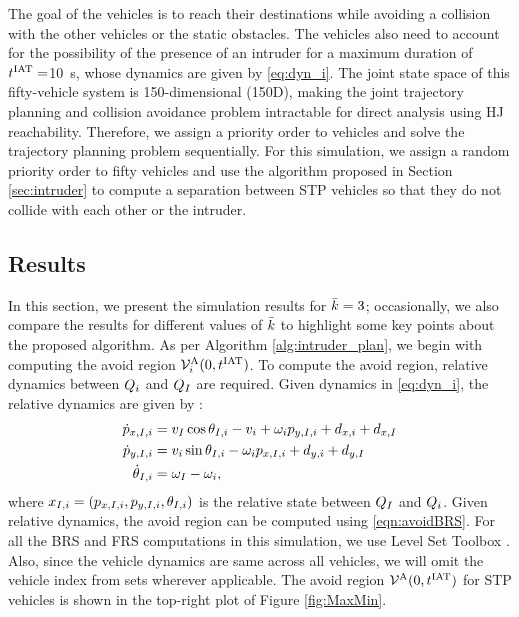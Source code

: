 The goal of the vehicles is to reach their destinations while avoiding a collision with the other vehicles or the static obstacles. The vehicles also need to account for the possibility of the presence of an intruder for a maximum duration of $t^\text{IAT} = $\SI{10}{\s}, whose dynamics are given by \eqref{eq:dyn_i}. The joint state space of this fifty-vehicle system is 150-dimensional (150D), making the joint trajectory planning and collision avoidance problem intractable for direct analysis using HJ reachability. Therefore, we assign a priority order to vehicles and solve the trajectory planning problem sequentially. For this simulation, we assign a random priority order to fifty vehicles and use the algorithm proposed in Section \ref{sec:intruder} to compute a separation between STP vehicles so that they do not collide with each other or the intruder. 

\subsection{Results \label{sec:simResults}}
In this section, we present the simulation results for $\bar{k} = 3$; occasionally, we also compare the results for different values of $\bar{k}$ to highlight some key points about the proposed algorithm. As per Algorithm \ref{alg:intruder_plan}, we begin with computing the avoid region $\mathcal{V}^{\text{A}}_{i}(0, t^\text{IAT})$. To compute the avoid region, relative dynamics between $Q_i$ and $Q_{I}$ are required. Given dynamics in \eqref{eq:dyn_i}, the relative dynamics are given by \cite{Mitchell05}:
\begin{equation}
\label{eq:reldyn_i}
\begin{aligned}
\dot{\pos}_{x, \intr, i} &= v_{\intr} \cos \theta_{\intr, i} - v_i + \omega_i {\pos}_{y, \intr, i} + d_{x,i} + d_{x,\intr}\\
\dot{\pos}_{y, \intr, i} &= v_i \sin \theta_{\intr, i} - \omega_i {\pos}_{x, \intr, i} + d_{y,i} + d_{y,\intr}\\
\dot{\theta}_{\intr, i} &= \omega_{\intr} - \omega_i,
\end{aligned}
\end{equation}    
where $x_{I, i} = (p_{x, I, i}, p_{y, I, i}, \theta_{I, i})$ is the relative state between $Q_{I}$ and $Q_i$. Given relative dynamics, the avoid region can be computed using \eqref{eqn:avoidBRS}. For all the BRS and FRS computations in this simulation, we use Level Set Toolbox \cite{Mitchell07b}. Also, since the vehicle dynamics are same across all vehicles, we will omit the vehicle index from sets wherever applicable. The avoid region $\mathcal{V}^{\text{A}}(0, t^\text{IAT})$ for STP vehicles is shown in the top-right plot of Figure \ref{fig:MaxMin}.


